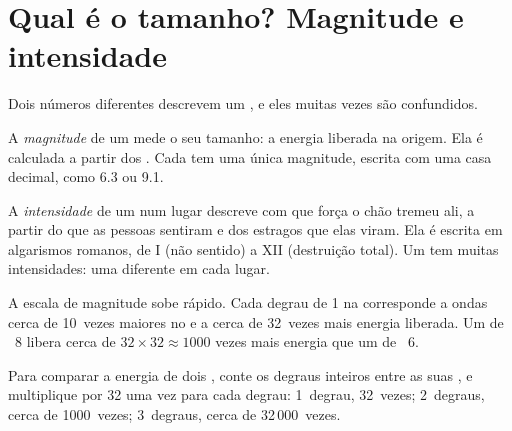 \section{Qual é o tamanho? Magnitude e intensidade}

Dois números diferentes descrevem um , e eles muitas vezes são confundidos.

\begin{definition}[Magnitude]\label{def:g7:earthquakes:magnitude}
A \emph{magnitude} de um  mede o seu tamanho: a
energia liberada na origem. Ela é calculada a partir dos .
Cada  tem uma única magnitude, escrita com uma casa decimal,
como 6.3 ou 9.1.
\end{definition}

\begin{definition}[Intensidade]\label{def:g7:earthquakes:intensity}
A \emph{intensidade} de um  num lugar descreve
com que força o chão tremeu ali, a partir do que as pessoas sentiram e
dos estragos que elas viram. Ela é escrita em algarismos romanos, de I
(não sentido) a XII (destruição total). Um  tem muitas
intensidades: uma diferente em cada lugar.
\end{definition}

A escala de magnitude sobe rápido. Cada degrau de 1 na 
corresponde a ondas cerca de 10~vezes maiores no  e a cerca de
32~vezes mais energia liberada. Um  de ~8 libera cerca
de $32 \times 32 \approx 1000$ vezes mais energia que um de ~6.

\begin{method}\label{met:g7:earthquakes:magnitudes}
Para comparar a energia de dois , conte os degraus inteiros
entre as suas , e multiplique por 32 uma vez para cada degrau:
1~degrau, 32~vezes; 2~degraus, cerca de 1000~vezes; 3~degraus, cerca de
32\,000~vezes.
\end{method}


